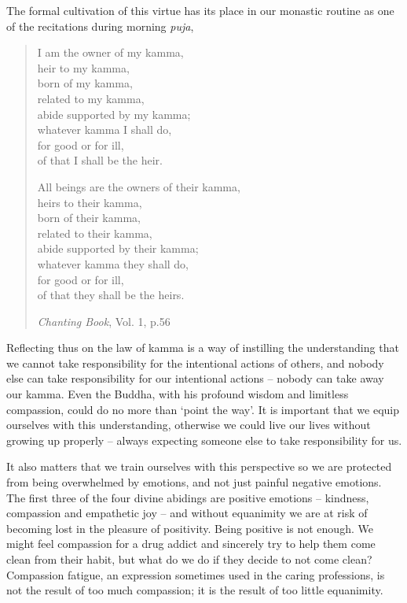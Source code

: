 The formal cultivation of this virtue has its place in our monastic
routine as one of the recitations during morning \emph{puja},

\enlargethispage{\baselineskip}

\begin{quote}
  I am the owner of my kamma,\\
  heir to my kamma,\\
  born of my kamma,\\
  related to my kamma,\\
  abide supported by my kamma;\\
  whatever kamma I shall do,\\
  for good or for ill,\\
  of that I shall be the heir.

  All beings are the owners of their kamma,\\
  heirs to their kamma,\\
  born of their kamma,\\
  related to their kamma,\\
  abide supported by their kamma;\\
  whatever kamma they shall do,\\
  for good or for ill,\\
  of that they shall be the heirs.

  \emph{Chanting Book}, Vol. 1, p.56\cite{chanting}
\end{quote}

Reflecting thus on the law of kamma is a way of instilling the
understanding that we cannot take responsibility for the intentional
actions of others, and nobody else can take responsibility for our
intentional actions -- nobody can take away our kamma. Even the Buddha,
with his profound wisdom and limitless compassion, could do no more than
`point the way'. It is important that we equip ourselves with this
understanding, otherwise we could live our lives without growing up
properly -- always expecting someone else to take responsibility for us.

It also matters that we train ourselves with this perspective so we are
protected from being overwhelmed by emotions, and not just painful
negative emotions. The first three of the four divine abidings are
positive emotions -- kindness, compassion and empathetic joy -- and
without equanimity we are at risk of becoming lost in the pleasure of
positivity. Being positive is not enough. We might feel compassion for a
drug addict and sincerely try to help them come clean from their habit,
but what do we do if they decide to not come clean? Compassion fatigue,
an expression sometimes used in the caring professions, is not the
result of too much compassion; it is the result of too little
equanimity.

